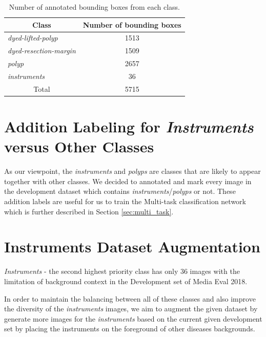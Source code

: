 \begin{table}[tbh]
\caption{Number of annotated bounding boxes from each class.}
\centering
\begin{tabular}{|l|c|}
\hline
\multicolumn{1}{|c|}{\textbf{Class}} & \textbf{Number of bounding boxes} \\ \hline
\textit{dyed-lifted-polyp}                    & 1513                              \\ \hline
\textit{dyed-resection-margin}                & 1509                              \\ \hline
\textit{polyp}                                & 2657                              \\ \hline
\textit{instruments}                          & 36                                \\ \hline
\multicolumn{1}{|c|}{Total}          & 5715                              \\ \hline
\end{tabular}
\label{tab:count_bbox}
\end{table}

\section{Addition Labeling for \textit{Instruments} versus Other Classes}
As our viewpoint, the \textit{instruments} and \textit{polyps} are classes that are likely to appear together with other classes. We decided to annotated and mark every image in the development dataset which contains \textit{instruments}/\textit{polyps} or not. These addition labels are useful for us to train the Multi-task classification network which is further described in Section \ref{sec:multi_task}.

\section{Instruments Dataset Augmentation}
\label{sec:augment}
\textit{Instruments} - the second highest priority class has only 36 images with the limitation of background context in the Development set of Media Eval 2018. 

In order to maintain the balancing between all of these classes and also improve the diversity of the \textit{instruments} images, we aim to augment the given dataset by generate more images for the \textit{instruments} based on the current given development set by placing the instruments on the foreground of other diseases backgrounds.

